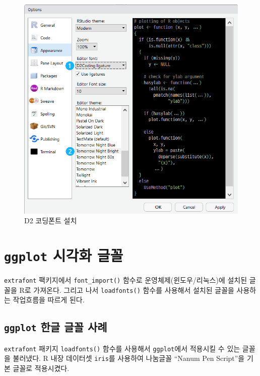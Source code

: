 \documentclass[
]{book}
\begin{document}
\begin{figure}
\centering
\includegraphics[width=1\textwidth,height=\textheight]{assets/images/font_d2coding.png}
\caption{D2 코딩폰트 설치}
\end{figure}

\hypertarget{r-viz-font}{%
\section{\texorpdfstring{\texttt{ggplot} 시각화 글꼴}{ggplot 시각화 글꼴}}\label{r-viz-font}}

\texttt{extrafont} 팩키지에서 \texttt{font\_import()} 함수로 운영체제(윈도우/리눅스)에
설치된 글꼴을 R로 가져온다. 그리고 나서 \texttt{loadfonts()} 함수를 사용해서
설치된 글꼴을 사용하는 작업흐름을 따르게 된다.

\hypertarget{font-viz-font-example}{%
\subsection{\texorpdfstring{\texttt{ggplot} 한글 글꼴 사례}{ggplot 한글 글꼴 사례}}\label{font-viz-font-example}}

\texttt{extrafont} 패키지 \texttt{loadfonts()} 함수를 사용해서 \texttt{ggplot}에서 적용시킬 수 있는
글꼴을 불러냈다. R 내장 데이터셋 \texttt{iris}를 사용하여 나눔글꼴 ``Nanum Pen Script''을 기본 글꼴로 적용시켰다.
\end{document}
